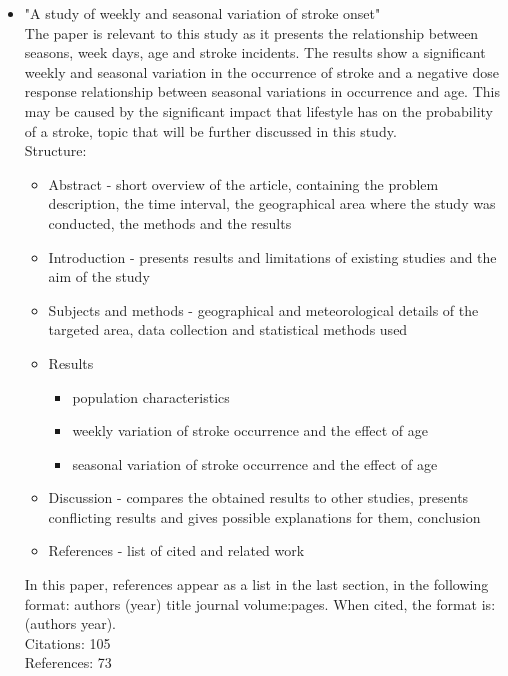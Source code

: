 \documentclass{article}
\begin{document}
\begin{itemize}

\item\large "A study of weekly and seasonal variation of stroke onset"\\

\normalsize The paper \cite{Wang:2002dg} is relevant to this study as it presents the relationship between seasons, week days, age and stroke incidents. The results show a significant weekly and seasonal variation in the occurrence of stroke and a negative dose response relationship between seasonal variations in occurrence and age. This may be caused by the significant impact that lifestyle has on the probability of a stroke, topic that will be further discussed in this study.\\

Structure:
\begin{itemize}
\item Abstract - short overview of the article, containing the problem description, the time interval, the geographical area where the study was conducted, the methods and the results
\item Introduction - presents results and limitations of existing studies and the aim of the study
\item Subjects and methods - geographical and meteorological details of the targeted area, data collection and statistical methods used
\item Results
\begin{itemize}
    \item population characteristics
    \item weekly variation of stroke occurrence and the effect of age
    \item seasonal variation of stroke occurrence and the effect of age
\end{itemize}
\item Discussion - compares the obtained results to other studies, presents conflicting results and gives possible explanations for them, conclusion
\item References - list of cited and related work
\end{itemize}
In this paper, references appear as a list in the last section, in the following format: authors (year) title journal volume:pages. When cited, the format is: (authors year).\\

Citations: 105\\
References: 73



\end{itemize}
\end{document}

